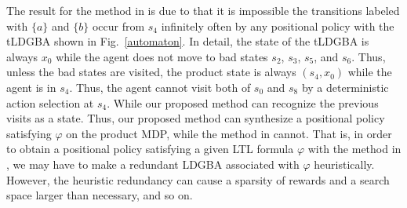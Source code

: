 \documentclass[letterpaper, 10 pt, conference]{ieeeconf}  %
\begin{document}
The result for the method in \cite{HAK2019,HKAKPL2019} is due to that it is impossible the transitions labeled with $\{ a \}$ and $\{ b \}$ occur from $s_4$ infinitely often by any positional policy with the tLDGBA shown in Fig.\ \ref{automaton}. In detail, the state of the tLDGBA is always $x_0$ while the agent does not move to bad states $s_2$, $s_3$, $s_5$, and $s_6$. Thus, unless the bad states are visited, the product state is always $(s_4, x_0)$ while the agent is in $s_4$. Thus, the agent cannot visit both of $s_0$ and $s_8$ by a deterministic action selection at $s_4$. While our proposed method can recognize the previous visits as a state. Thus, our proposed method can synthesize a positional policy satisfying $\varphi$ on the product MDP, while the method in \cite{HAK2019, HKAKPL2019} cannot. That is, in order to obtain a positional policy satisfying a given LTL formula $\varphi$ with the method in \cite{HAK2019,HKAKPL2019}, we may have to make a redundant LDGBA associated with $\varphi$ heuristically. However, the heuristic redundancy can cause a sparsity of rewards and a search space larger than necessary, and so on.
\end{document}

